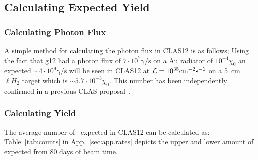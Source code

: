 \subsection{Calculating Expected Yield}
\subsubsection{Calculating Photon Flux}\label{sec:calflux}
A simple method for calculating the photon flux in CLAS12 is as follows; Using the fact that g12 had a photon flux of $7\cdot 10^7 \mathrm{\gamma/s}$ on a Au radiator of $10^{-4} \chi_0$ an expected $\sim 4\cdot 10^9  \mathrm{\gamma/s}$ will be seen in CLAS12 at ${\cal L} = 10^{35}\mathrm{cm^{-2}s^{-1}}$ on a 5~cm $\ell H_2$ target which is $\sim 5.7\cdot 10^{-3} \chi_0$. This number has been independently confirmed in a previous CLAS proposal~\cite{clas.proposal.meson}.
\subsubsection{Calculating Yield}
The average number of \etaDal \ expected in CLAS12 can be calculated as:
Table~\ref{tab:counts} in App.~\ref{sec:app.rates} depicts the upper and lower amount of \epemT expected from 80 days of beam time.




